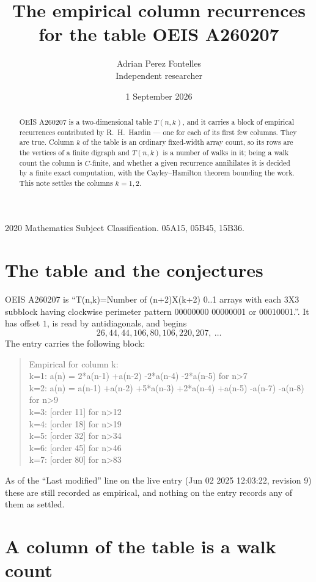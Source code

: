 \documentclass[11pt,a4paper]{article}
\title{The empirical column recurrences for the table OEIS A260207}
\author{Adrian Perez Fontelles\\ \small Independent researcher}
\date{1 September 2026}
\theoremstyle{plain}
\theoremstyle{definition}
\begin{document}
\maketitle

\begin{abstract}
OEIS A260207 is a two-dimensional table $T(n,k)$, and it carries a block of empirical
recurrences contributed by R.~H.~Hardin --- one for each of its first few columns. They are
true. Column $k$ of the table is an ordinary fixed-width array count, so its rows are the
vertices of a finite digraph and $T(n,k)$ is a number of walks in it; being a walk count the
column is $C$-finite, and whether a given recurrence annihilates it is decided by a finite
exact computation, with the Cayley--Hamilton theorem bounding the work. This note settles the columns $k=1, 2$.
\end{abstract}

\noindent\small 2020 Mathematics Subject Classification. 05A15, 05B45, 15B36.\normalsize

\section{The table and the conjectures}

OEIS A260207 is ``T(n,k)=Number of (n+2)X(k+2) 0..1 arrays with each 3X3 subblock having clockwise perimeter pattern 00000000 00000001 or 00010001.''. It has offset $1$, is
read by antidiagonals, and begins
\[
26, 44, 44, 106, 80, 106, 220, 207,\ \dots
\]
The entry carries the following block:
\begin{quote}\small
Empirical for column k:\\
k=1: a(n) = 2*a(n-1) +a(n-2) -2*a(n-4) -2*a(n-5) for n>7\\
k=2: a(n) = a(n-1) +a(n-2) +5*a(n-3) +2*a(n-4) +a(n-5) -a(n-7) -a(n-8) for n>9\\
k=3: [order 11] for n>12\\
k=4: [order 18] for n>19\\
k=5: [order 32] for n>34\\
k=6: [order 45] for n>46\\
k=7: [order 80] for n>83\\
\end{quote}
As of the ``Last modified'' line on the live entry (Jun 02 2025 12:03:22, revision 9) these are still
recorded as empirical, and nothing on the entry records any of them as settled.

\section{A column of the table is a walk count}
\end{document}
